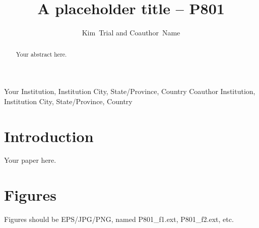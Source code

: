 \documentclass[11pt,twoside]{article}
\begin{document}
\title{A placeholder title -- P801}

\author{Kim~Trial and Coauthor~Name}
Your Institution, Institution City, State/Province, Country
Coauthor Institution, Institution City, State/Province, Country



\begin{abstract}
Your abstract here.
\end{abstract}

\section{Introduction}

Your paper here.

\section{Figures}

Figures should be EPS/JPG/PNG, named P801\_f1.ext, P801\_f2.ext, etc.

% 
\end{document}
